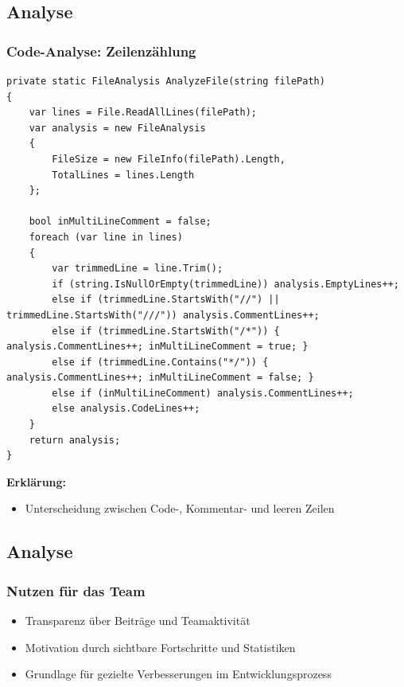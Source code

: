 \documentclass{beamer}
\begin{document}
\subsection{Analyse}
\begin{frame}[fragile]
\frametitle{Code-Analyse: Zeilenzählung}
\begin{lstlisting}[language=CSharp, basicstyle=\ttfamily\tiny, breaklines=true]
private static FileAnalysis AnalyzeFile(string filePath)
{
    var lines = File.ReadAllLines(filePath);
    var analysis = new FileAnalysis
    {
        FileSize = new FileInfo(filePath).Length,
        TotalLines = lines.Length
    };

    bool inMultiLineComment = false;
    foreach (var line in lines)
    {
        var trimmedLine = line.Trim();
        if (string.IsNullOrEmpty(trimmedLine)) analysis.EmptyLines++;
        else if (trimmedLine.StartsWith("//") || trimmedLine.StartsWith("///")) analysis.CommentLines++;
        else if (trimmedLine.StartsWith("/*")) { analysis.CommentLines++; inMultiLineComment = true; }
        else if (trimmedLine.Contains("*/")) { analysis.CommentLines++; inMultiLineComment = false; }
        else if (inMultiLineComment) analysis.CommentLines++;
        else analysis.CodeLines++;
    }
    return analysis;
}
\end{lstlisting}

\textbf{Erklärung:}
{\footnotesize
\begin{itemize}
  \item Unterscheidung zwischen Code-, Kommentar- und leeren Zeilen
\end{itemize}}
\end{frame}

\subsection{Analyse}
\begin{frame}
\frametitle{Nutzen für das Team}
\begin{itemize}
  \item Transparenz über Beiträge und Teamaktivität
  \item Motivation durch sichtbare Fortschritte und Statistiken
  \item Grundlage für gezielte Verbesserungen im Entwicklungsprozess
\end{itemize}
\end{frame}
\end{document}
